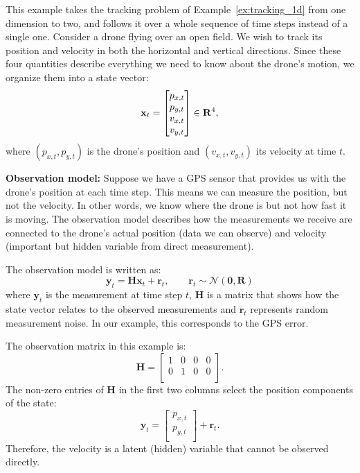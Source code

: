 \begin{example}\label{ex:drone}
This example takes the tracking problem of Example~\ref{ex:tracking_1d} from one dimension to two, and follows it over a whole sequence of time steps instead of a single one. Consider a drone flying over an open field. We wish to track its position and velocity in both the horizontal and vertical directions. Since these four quantities describe everything we need to know about the drone's motion, we organize them into a state vector:
\[ 
\mathbf{x}_t = 
\begin{bmatrix}
    p_{x,t} \\ 
    p_{y,t} \\ 
    v_{x,t} \\ 
    v_{y,t} 
\end{bmatrix} \in \mathbf{R}^{4},
\]
where $(p_{x,t}, p_{y,t})$ is the drone's position and $(v_{x,t}, v_{y,t})$ its
velocity at time $t$. 

\textbf{Observation model:} Suppose we have a GPS sensor that provides us with the drone's position at each time step. This means we can measure the position, but not the velocity. In other words, we know where the drone is but not how fast it is moving. The observation model describes how the measurements we receive are connected to the drone's actual position (data we can observe) and velocity (important but hidden variable from direct measurement). 

The observation model is written as: 
\begin{equation}\label{eq: drone observation}
\mathbf{y}_t = \mathbf{H}\mathbf{x}_{t}+\mathbf{r}_{t}, 
\qquad 
\mathbf{r}_t \sim \mathcal{N}(\mathbf{0}, \mathbf{R})
\end{equation}
where $\mathbf{y}_t$ is the measurement at time step $t$, $\mathbf{H}$ is a matrix that shows how the state vector relates to the observed measurements and $\mathbf{r}_t$ represents random measurement noise. In our example, this corresponds to the GPS error. 

The observation matrix in this example is: 
\[
\mathbf{H} = 
\begin{bmatrix}
   1 & 0 & 0 & 0\\
   0 & 1 & 0 & 0\\   
\end{bmatrix}.
\]
The non-zero entries of $\mathbf{H}$ in the first two columns select the position components of the state:
\[
\mathbf{y}_t = 
\begin{bmatrix}
   p_{x,t} \\
   p_{y,t} \\ 
\end{bmatrix} 
+ \mathbf{r}_t.
\]
Therefore, the velocity is a latent (hidden) variable that cannot be observed directly.



\end{example}
